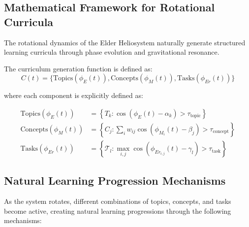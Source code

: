 \subsection{Mathematical Framework for Rotational Curricula}

The rotational dynamics of the Elder Heliosystem naturally generate structured learning curricula through phase evolution and gravitational resonance.

\begin{definition}
\label{def:rotational_curriculum}
The curriculum generation function is defined as:
\begin{equation}
C(t) = \{\text{Topics}(\phi_E(t)), \text{Concepts}(\phi_M(t)), \text{Tasks}(\phi_{Er}(t))\}
\end{equation}

where each component is explicitly defined as:

\begin{align}
\text{Topics}(\phi_E(t)) &= \left\{T_k : \cos(\phi_E(t) - \alpha_k) > \tau_{\text{topic}}\right\} \\
\text{Concepts}(\phi_M(t)) &= \left\{C_j : \sum_i w_{ij} \cos(\phi_{M_i}(t) - \beta_j) > \tau_{\text{concept}}\right\} \\
\text{Tasks}(\phi_{Er}(t)) &= \left\{\mathcal{T}_l : \max_{i,j} \cos(\phi_{Er_{i,j}}(t) - \gamma_l) > \tau_{\text{task}}\right\}
\end{align}
\end{definition}

\subsection{Natural Learning Progression Mechanisms}

As the system rotates, different combinations of topics, concepts, and tasks become active, creating natural learning progressions through the following mechanisms:

